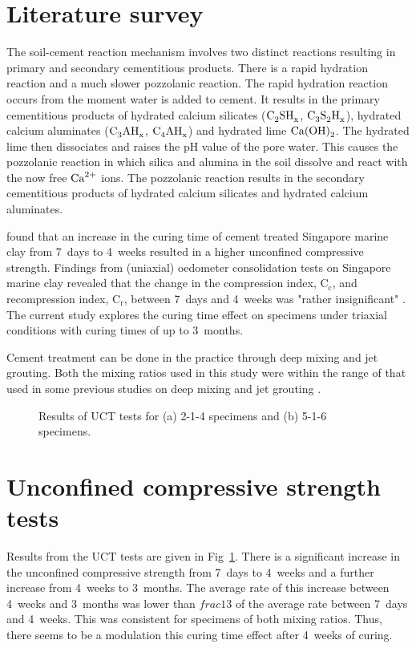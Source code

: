 \documentclass{nuropc}
\begin{document}
\section{Literature survey}
The soil-cement reaction mechanism involves two distinct reactions 
resulting in primary and secondary cementitious products. 
There is a rapid hydration reaction and a much slower pozzolanic reaction. 
The rapid hydration reaction occurs from the moment water is added to cement. 
It results in the primary cementitious products of 
hydrated calcium silicates ($\ce{C2SH_{x}}$, $\ce{C3S2H_{x}}$), 
hydrated calcium aluminates ($\ce{C3AH_{x}}$, $\ce{C4AH_{x}}$) and 
hydrated lime $\ce{Ca(OH)2}$. 
The hydrated lime then dissociates and 
raises the pH value of the pore water. 
This causes the pozzolanic reaction in which 
silica and alumina in the soil dissolve and 
react with the now free $\ce{Ca^2+}$ ions. 
The pozzolanic reaction results in the secondary cementitious products of 
hydrated calcium silicates and hydrated calcium aluminates. 

\citet{strength-compression} found that an increase in the curing time of 
cement treated Singapore marine clay 
from 7~days to 4~weeks resulted in a higher unconfined compressive strength. 
Findings from (uniaxial) oedometer consolidation tests on Singapore marine 
clay revealed that the change in the compression index, 
$\mathrm{C_c}$, and recompression index, $\mathrm{C_r}$, 
between 7~days and 4~weeks was "rather insignificant" \citep{compression}.
The current study explores the curing time effect on specimens 
under triaxial conditions with curing times of up to 3~months.

Cement treatment can be done in the practice through 
deep mixing and jet grouting. 
Both the mixing ratios used in this study 
were within the range of that used in some previous studies
on deep mixing and jet grouting \citep{cement-contents}.

\begin{figure}[htbp]
\centering

\caption{Results of UCT tests for (a) 2-1-4 specimens and (b) 5-1-6 specimens.}
\label{fig:UCT}
\end{figure}

\section{Unconfined compressive strength tests}
Results from the UCT tests are given in Fig~\ref{fig:UCT}.
There is a significant increase in the unconfined compressive strength 
from 7~days to 4~weeks and a further increase from 4~weeks to 3~months.
The average rate of this increase between 4~weeks and 3~months was 
lower than $frac{1}{3}$ of the average rate between 7~days and 4~weeks.
This was consistent for specimens of both mixing ratios. 
Thus, there seems to be a modulation this curing time effect 
after 4~weeks of curing. 
\end{document}
